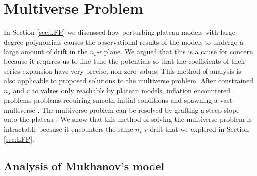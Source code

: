 \documentclass[a4paper,11pt]{article}
\def\nsr{$n_s$-$r$ }
\begin{document}
\FloatBarrier
\newpage
\section{Multiverse Problem}

In Section \ref{sec:LFP} we discussed how perturbing plateau models with large degree polynomials causes the observational results of the models to undergo a large amount of drift in the \nsr plane. We argued that this is a cause for concern because it requires us to fine-tune the potentials so that the coefficients of their series expansion have very precise, non-zero values. This method of analysis is also applicable to proposed solutions to the multiverse problem. After \citet{Planck2013} constrained $n_s$ and $r$ to values only reachable by plateau models, inflation encountered problems problems requiring smooth initial conditions and spawning a vast multiverse \citep{Ijjas+2013}. The multiverse problem can be resolved by grafting a steep slope onto the plateau \citep{Ijjas+2013,Mukhanov2014}. We show that this method of solving the multiverse problem is intractable because it encounters the same \nsr drift that we explored in Section \ref{sec:LFP}.

\subsection{Analysis of Mukhanov's model}
\end{document}
